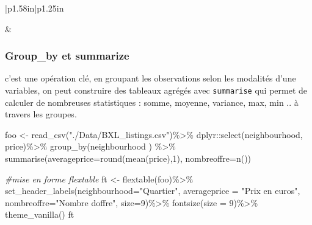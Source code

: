 \documentclass[
]{book}
\newenvironment{Shaded}{\begin{snugshade}}{\end{snugshade}}
\newcommand{\AttributeTok}[1]{\textcolor[rgb]{0.77,0.63,0.00}{#1}}
\newcommand{\CommentTok}[1]{\textcolor[rgb]{0.56,0.35,0.01}{\textit{#1}}}
\newcommand{\DecValTok}[1]{\textcolor[rgb]{0.00,0.00,0.81}{#1}}
\newcommand{\FunctionTok}[1]{\textcolor[rgb]{0.00,0.00,0.00}{#1}}
\newcommand{\NormalTok}[1]{#1}
\newcommand{\OtherTok}[1]{\textcolor[rgb]{0.56,0.35,0.01}{#1}}
\newcommand{\SpecialCharTok}[1]{\textcolor[rgb]{0.00,0.00,0.00}{#1}}
\newcommand{\StringTok}[1]{\textcolor[rgb]{0.31,0.60,0.02}{#1}}
\begin{document}
\begin{longtable}[c]{|p{1.58in}|p{1.25in}}
\noalign{\global\setlength{\arrayrulewidth}{0.5pt}}



 &  \\

\noalign{\global\setlength{\arrayrulewidth}{2pt}}



\end{longtable}

\hypertarget{group_by-et-summarize}{%
\subsubsection{Group\_by et summarize}\label{group_by-et-summarize}}

c'est une opération clé, en groupant les observations selon les modalités d'une variables, on peut construire des tableaux agrégés avec \texttt{summarise} qui permet de calculer de nombreuses statistiques : somme, moyenne, variance, max, min .. à travers les groupes.

\begin{Shaded}
\begin{Highlighting}[]
\NormalTok{foo }\OtherTok{\textless{}{-}} \FunctionTok{read\_csv}\NormalTok{(}\StringTok{"./Data/BXL\_listings.csv"}\NormalTok{)}\SpecialCharTok{\%\textgreater{}\%} 
\NormalTok{  dplyr}\SpecialCharTok{::}\FunctionTok{select}\NormalTok{(neighbourhood, price)}\SpecialCharTok{\%\textgreater{}\%}
    \FunctionTok{group\_by}\NormalTok{(neighbourhood ) }\SpecialCharTok{\%\textgreater{}\%} 
  \FunctionTok{summarise}\NormalTok{(}\AttributeTok{averageprice=}\FunctionTok{round}\NormalTok{(}\FunctionTok{mean}\NormalTok{(price),}\DecValTok{1}\NormalTok{),}
            \AttributeTok{nombreoffre=}\FunctionTok{n}\NormalTok{())}

\CommentTok{\#mise en forme flextable}
\NormalTok{ft }\OtherTok{\textless{}{-}} \FunctionTok{flextable}\NormalTok{(foo)}\SpecialCharTok{\%\textgreater{}\%} 
  \FunctionTok{set\_header\_labels}\NormalTok{(}\AttributeTok{neighbourhood=}\StringTok{"Quartier"}\NormalTok{,}
  \AttributeTok{averageprice =} \StringTok{"Prix en euros"}\NormalTok{,}
  \AttributeTok{nombreoffre=}\StringTok{"Nombre d\textquotesingle{}offre"}\NormalTok{, }\AttributeTok{size=}\DecValTok{9}\NormalTok{)}\SpecialCharTok{\%\textgreater{}\%}  
  \FunctionTok{fontsize}\NormalTok{(}\AttributeTok{size =} \DecValTok{9}\NormalTok{)}\SpecialCharTok{\%\textgreater{}\%}
  \FunctionTok{theme\_vanilla}\NormalTok{() }
\NormalTok{ft}
\end{Highlighting}
\end{Shaded}
\end{document}
